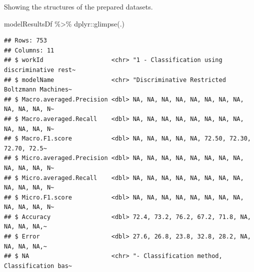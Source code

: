 \documentclass[
]{article}
\newenvironment{Shaded}{\begin{snugshade}}{\end{snugshade}}
\newcommand{\FunctionTok}[1]{\textcolor[rgb]{0.00,0.00,0.00}{#1}}
\newcommand{\NormalTok}[1]{#1}
\newcommand{\OtherTok}[1]{\textcolor[rgb]{0.56,0.35,0.01}{#1}}
\newcommand{\SpecialCharTok}[1]{\textcolor[rgb]{0.00,0.00,0.00}{#1}}
\newcommand{\StringTok}[1]{\textcolor[rgb]{0.31,0.60,0.02}{#1}}
\begin{document}
\begin{Shaded}
\end{Shaded}

Showing the structures of the prepared datasets.

\begin{Shaded}
\begin{Highlighting}[]
\NormalTok{modelResultsDf }\SpecialCharTok{\%\textgreater{}\%}\NormalTok{ dplyr}\SpecialCharTok{::}\FunctionTok{glimpse}\NormalTok{(.)}
\end{Highlighting}
\end{Shaded}

\begin{verbatim}
## Rows: 753
## Columns: 11
## $ workId                   <chr> "1 - Classification using discriminative rest~
## $ modelName                <chr> "Discriminative Restricted Boltzmann Machines~
## $ Macro.averaged.Precision <dbl> NA, NA, NA, NA, NA, NA, NA, NA, NA, NA, NA, N~
## $ Macro.averaged.Recall    <dbl> NA, NA, NA, NA, NA, NA, NA, NA, NA, NA, NA, N~
## $ Macro.F1.score           <dbl> NA, NA, NA, NA, NA, 72.50, 72.30, 72.70, 72.5~
## $ Micro.averaged.Precision <dbl> NA, NA, NA, NA, NA, NA, NA, NA, NA, NA, NA, N~
## $ Micro.averaged.Recall    <dbl> NA, NA, NA, NA, NA, NA, NA, NA, NA, NA, NA, N~
## $ Micro.F1.score           <dbl> NA, NA, NA, NA, NA, NA, NA, NA, NA, NA, NA, N~
## $ Accuracy                 <dbl> 72.4, 73.2, 76.2, 67.2, 71.8, NA, NA, NA, NA,~
## $ Error                    <dbl> 27.6, 26.8, 23.8, 32.8, 28.2, NA, NA, NA, NA,~
## $ NA                       <chr> "- Classification method,  Classification bas~
\end{verbatim}
\end{document}
